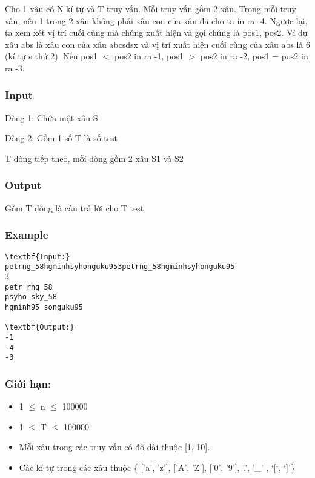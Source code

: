 



     Cho 1 xâu có N kí tự và T truy vấn. Mỗi truy vấn gồm 2 xâu. Trong mỗi truy vấn, nếu 1 trong 2 xâu không phải xâu con của xâu đã cho ta in ra -4. Ngược lại, ta xem xét vị trí cuối cùng mà chúng xuất hiện và gọi chúng là pos1, pos2. Ví dụ xâu abs là xâu con của xâu abcsdsx và vị trí xuất hiện cuối cùng của xâu abs là 6 (kí tự s thứ 2). Nếu pos1 $<$ pos2 in ra -1, pos1 $>$ pos2 in ra -2, pos1 = pos2 in ra -3.    

\subsubsection{   Input  }

   Dòng 1: Chứa một xâu S  

   Dòng 2: Gồm 1 số T là số test  

   T dòng tiếp theo, mỗi dòng gồm 2 xâu S1 và S2  

\subsubsection{   Output  }

   Gồm T dòng là câu trả lời cho T test  

\subsubsection{   Example  }
\begin{verbatim}
\textbf{Input:}
petrng_58hgminhsyhonguku953petrng_58hgminhsyhonguku95
3
petr rng_58
psyho sky_58
hgminh95 songuku95

\textbf{Output:}
-1
-4
-3

\end{verbatim}

\subsubsection{   Giới hạn:  }
\begin{itemize}
	\item        1  $\le$  n  $\le$  100000      
	\item          1  $\le$  T  $\le$  100000        
	\item            Mỗi xâu trong các truy vấn có độ dài thuộc [1, 10].          
	\item              Các kí tự trong các xâu thuộc \{ ['a', 'z'], ['A', 'Z'], ['0', '9'], '.', '\_' , ‘[‘, ‘]’\}            
\end{itemize}
